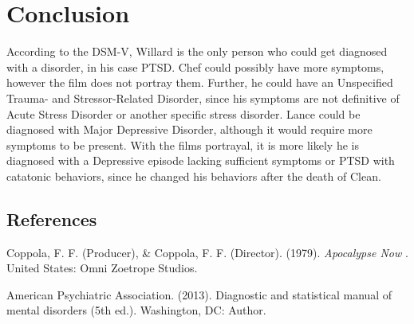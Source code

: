 \documentclass[a4paper,man,natbib]{apa6}
\begin{document}
\section{Conclusion}	

According to the DSM-V, Willard is the only person who could get diagnosed with a disorder, in his case PTSD. Chef could possibly have more symptoms, however the film does not portray them. Further, he could have an Unspecified Trauma- and
Stressor-Related Disorder, since his symptoms are not definitive of Acute Stress Disorder or another specific stress disorder. Lance could be diagnosed with Major Depressive Disorder, although it would require more symptoms to be present. With the films portrayal, it is more likely he is diagnosed with a Depressive episode lacking sufficient symptoms or PTSD with catatonic behaviors, since he changed his behaviors after the death of Clean.\\

\raggedbottom
\pagebreak
\subsection{References}

\noindent Coppola, F. F. (Producer), \& Coppola, F. F. (Director). (1979). \textit{Apocalypse Now}
. United States: Omni Zoetrope Studios.

\noindent American Psychiatric Association. (2013). Diagnostic and statistical manual of mental
\indent disorders (5th ed.). Washington, DC: Author.
\end{document}

